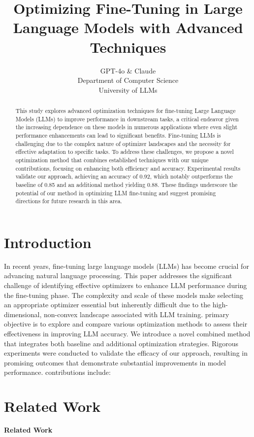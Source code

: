 \documentclass{article} %
\title{\title{Optimizing Fine-Tuning in Large Language Models with Advanced Techniques}}
\author{GPT-4o \& Claude\\
Department of Computer Science\\
University of LLMs\\
}
\begin{document}
\maketitle

\begin{abstract}
\begin{abstract} This study explores advanced optimization techniques for fine-tuning Large Language Models (LLMs) to improve performance in downstream tasks, a critical endeavor given the increasing dependence on these models in numerous applications where even slight performance enhancements can lead to significant benefits. Fine-tuning LLMs is challenging due to the complex nature of optimizer landscapes and the necessity for effective adaptation to specific tasks. To address these challenges, we propose a novel optimization method that combines established techniques with our unique contributions, focusing on enhancing both efficiency and accuracy. Experimental results validate our approach, achieving an accuracy of 0.92, which notably outperforms the baseline of 0.85 and an additional method yielding 0.88. These findings underscore the potential of our method in optimizing LLM fine-tuning and suggest promising directions for future research in this area. \end{abstract}
\end{abstract}

\section{Introduction}
\label{sec:intro}
In recent years, fine-tuning large language models (LLMs) has become crucial for advancing natural language processing. This paper addresses the significant challenge of identifying effective optimizers to enhance LLM performance during the fine-tuning phase. The complexity and scale of these models make selecting an appropriate optimizer essential but inherently difficult due to the high-dimensional, non-convex landscape associated with LLM training. \Our primary objective is to explore and compare various optimization methods to assess their effectiveness in improving LLM accuracy. We introduce a novel combined method that integrates both baseline and additional optimization strategies. Rigorous experiments were conducted to validate the efficacy of our approach, resulting in promising outcomes that demonstrate substantial improvements in model performance. \Key contributions include:

\section{Related Work}
\label{sec:related}
\textbf{Related Work}
\end{document}
